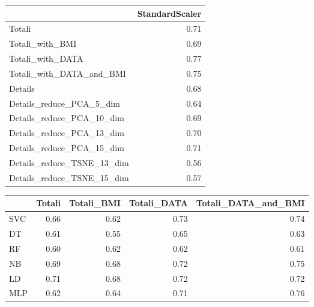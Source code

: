 \documentclass[12pt,italian]{report}
\begin{document}
\begin{table}[h]
	\begin{center}
		\begin{adjustbox}{max width=\textwidth}
			\begin{tabular}{lr}
				\toprule
				{} &  StandardScaler \\
				\midrule
				Totali                     &        0.71 \\
				Totali\_with\_BMI            &        0.69 \\
				Totali\_with\_DATA           &        \cellcolor{orange}0.77 \\
				Totali\_with\_DATA\_and\_BMI   &        0.75 \\
				Details                    &        0.68 \\
				Details\_reduce\_PCA\_5\_dim   &        0.64 \\
				Details\_reduce\_PCA\_10\_dim  &        0.69 \\
				Details\_reduce\_PCA\_13\_dim  &        0.70 \\
				Details\_reduce\_PCA\_15\_dim  &        0.71 \\
				Details\_reduce\_TSNE\_13\_dim &        0.56 \\
				Details\_reduce\_TSNE\_15\_dim &        0.57 \\
				\bottomrule
			\end{tabular}
		\end{adjustbox}
	\end{center}
\end{table}

\begin{table}[h]
	\begin{center}
		\begin{adjustbox}{max width=\textwidth}
			\begin{tabular}{lrrrr}
				\toprule
				{} &    Totali &  Totali\_BMI &  Totali\_DATA &  Totali\_DATA\_and\_BMI \\
				\midrule
				SVC &  0.66 &         0.62 &          0.73 &                  \cellcolor{cyan}0.74 \\
				DT  &  0.61 &         0.55 &          0.65 &                  0.63 \\
				RF  &  0.60 &         0.62 &          0.62 &                  0.61 \\
				NB  &  0.69 &         0.68 &          0.72 &                  \cellcolor{cyan}0.75 \\
				LD  &  0.71 &         0.68 &          \cellcolor{cyan}0.72 &                  0.72\\
				MLP &  0.62 &         0.64 &          0.71 &                  \cellcolor{orange}0.76\\
				\bottomrule
			\end{tabular}
		\end{adjustbox}
	\end{center}
\end{table}
\end{document}
